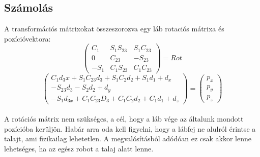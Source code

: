 \documentclass{article}
\begin{document}
\subsection{Számolás}
A transformációs mátrixokat összeszorozva egy láb rotaciós mátrixa és pozícióvektora:
$$
\begin{pmatrix}
C_1&S_1S_{23}&S_1C_{23}\\
0&C_{23}&-S_{23}\\
-S_1&C_1S_{23}&C_1C_{23}
\end{pmatrix}
=
Rot
$$
$$
\begin{pmatrix}
C_1d_3x+S_1C_{23}d_3+S_1C_2d_2+S_1d_1+d_x\\
-S_{23}d_3-S_2d_2+d_y\\
-S_1d_{3x}+C_1C_{23}D_3+C_1C_2d_2+C_1d_1+d_z
\end{pmatrix}
=
\begin{pmatrix}
p_x\\
p_y\\
p_z
\end{pmatrix}
$$
\\
A rotációs mátrix nem szükséges, a cél, hogy a láb vége az általunk mondott pozícióba kerüljön. Habár arra oda kell figyelni, hogy a lábfej ne alulról érintse a talajt, ami fizikailag lehetetlen. A megvalósításból adódóan ez csak akkor lenne lehetséges, ha az egész robot a talaj alatt lenne.
\end{document}
